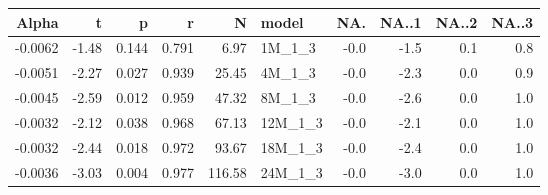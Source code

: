 \begin{table}[ht]
\centering
\begin{tabular}{rrrrrlrrrr}
  \hline
Alpha & t & p & r & N & model & NA. & NA..1 & NA..2 & NA..3 \\ 
  \hline
-0.0062 & -1.48 & 0.144 & 0.791 & 6.97 & 1M\_1\_3 & -0.0 & -1.5 & 0.1 & 0.8 \\ 
  -0.0051 & -2.27 & 0.027 & 0.939 & 25.45 & 4M\_1\_3 & -0.0 & -2.3 & 0.0 & 0.9 \\ 
  -0.0045 & -2.59 & 0.012 & 0.959 & 47.32 & 8M\_1\_3 & -0.0 & -2.6 & 0.0 & 1.0 \\ 
  -0.0032 & -2.12 & 0.038 & 0.968 & 67.13 & 12M\_1\_3 & -0.0 & -2.1 & 0.0 & 1.0 \\ 
  -0.0032 & -2.44 & 0.018 & 0.972 & 93.67 & 18M\_1\_3 & -0.0 & -2.4 & 0.0 & 1.0 \\ 
  -0.0036 & -3.03 & 0.004 & 0.977 & 116.58 & 24M\_1\_3 & -0.0 & -3.0 & 0.0 & 1.0 \\ 
   \hline
\end{tabular}
\end{table}

